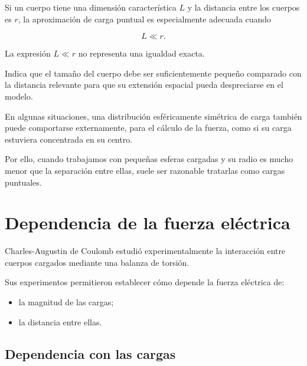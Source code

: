 Si un cuerpo tiene una dimensión característica \(L\) y la distancia entre
los cuerpos es \(r\), la aproximación de carga puntual es especialmente
adecuada cuando

\[
L\ll r.
\]

\begin{interpretacion}

La expresión \(L\ll r\) no representa una igualdad exacta.

Indica que el tamaño del cuerpo debe ser suficientemente pequeño comparado
con la distancia relevante para que su extensión espacial pueda despreciarse
en el modelo.

\end{interpretacion}

En algunas situaciones, una distribución esféricamente simétrica de carga
también puede comportarse externamente, para el cálculo de la fuerza, como si
su carga estuviera concentrada en su centro.

Por ello, cuando trabajamos con pequeñas esferas cargadas y su radio es mucho
menor que la separación entre ellas, suele ser razonable tratarlas como
cargas puntuales.



\section{Dependencia de la fuerza eléctrica}

Charles-Augustin de Coulomb estudió experimentalmente la interacción entre
cuerpos cargados mediante una balanza de torsión.

Sus experimentos permitieron establecer cómo depende la fuerza eléctrica de:

\begin{itemize}
    \item la magnitud de las cargas;
    \item la distancia entre ellas.
\end{itemize}



\subsection{Dependencia con las cargas}

